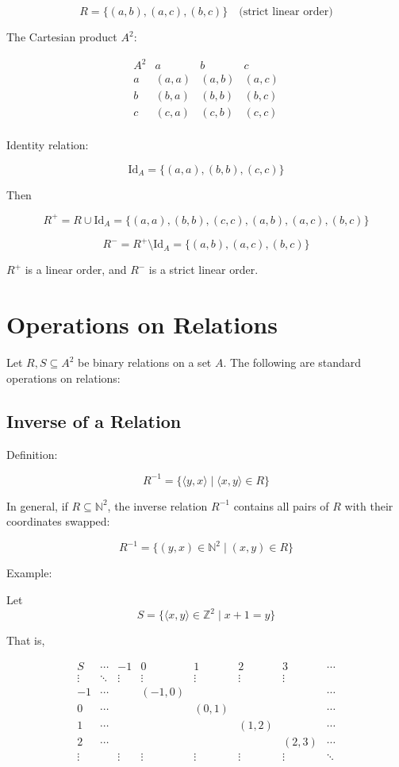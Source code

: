 \documentclass[12pt,a4paper,openany]{article}
\begin{document}
$$
R = \{(a,b),(a,c),(b,c)\} \quad \text{(strict linear order)}
$$

The Cartesian product $A^2$:

$$
\begin{array}{c|ccc}
A^2 & a & b & c \\
\hline
a & (a,a) & (a,b) & (a,c) \\
b & (b,a) & (b,b) & (b,c) \\
c & (c,a) & (c,b) & (c,c) \\
\end{array}
$$

Identity relation:

$$
\text{Id}_A = \{(a,a),(b,b),(c,c)\}
$$

Then  

$$
R^+ = R \cup \text{Id}_A = \{(a,a),(b,b),(c,c),(a,b),(a,c),(b,c)\}
$$

$$
R^- = R^+ \setminus \text{Id}_A = \{(a,b),(a,c),(b,c)\}
$$

$R^+$ is a linear order, and $R^-$ is a strict linear order.



\section{Operations on Relations}

Let $R, S \subseteq A^2$ be binary relations on a set $A$. The following are standard operations on relations:

\subsection{Inverse of a Relation}

Definition:

$$
R^{-1} = \{ \langle y, x \rangle \mid \langle x, y \rangle \in R \}
$$

In general, if $R \subseteq \mathbb{N}^2$, the inverse relation $R^{-1}$ contains all pairs of $R$ with their coordinates swapped:

$$
R^{-1} = \{ (y, x) \in \mathbb{N}^2 \mid (x, y) \in R \}
$$

Example:

Let $$S = \{ \langle x, y \rangle \in \mathbb{Z}^2 \mid x + 1 = y \}$$

That is,

$$
\begin{array}{c|ccccccc}
S & \cdots & -1 & 0 & 1 & 2 & 3 & \cdots \\
\hline
\vdots & \ddots & \vdots & \vdots & \vdots & \vdots & \vdots & \\
-1 & \cdots & & (-1,0) & & & & \cdots \\
0 & \cdots & & & (0,1) & & & \cdots \\
1 & \cdots & & & & (1,2) & & \cdots \\
2 & \cdots & & & & & (2,3) & \cdots \\
\vdots & & \vdots & \vdots & \vdots & \vdots & \vdots & \ddots \\
\end{array}
$$
\end{document}
